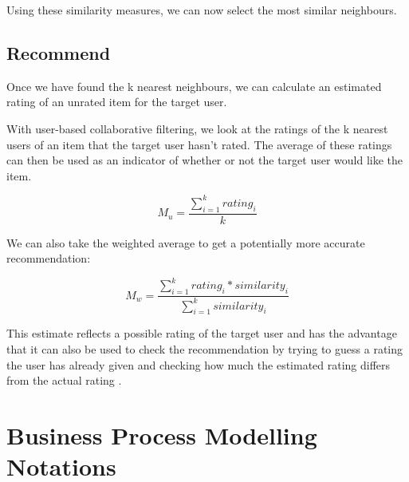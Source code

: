 Using these similarity measures, we can now select the most similar neighbours.

\subsection{Recommend}

Once we have found the k nearest neighbours, we can calculate an estimated rating of an unrated item for the target user. 

With user-based collaborative filtering, we look at the ratings of the k nearest users of an item that the target user hasn't rated. The average of these ratings can then be used as an indicator of whether or not the target user would like the item.

\begin{equation}
M_{u} = \frac{\sum_{i=1}^{k}{rating_i}}{k}
\label{mean}
\end{equation}

We can also take the weighted average to get a potentially more accurate recommendation:

\begin{equation}
M_{w} = \frac{\sum_{i=1}^{k}{rating_i * similarity_i}}{\sum_{i=1}^{k}{similarity_i}}
\label{weightedMean}
\end{equation}


This estimate reflects a possible rating of the target user and has the advantage that it can also be used to check the recommendation by trying to guess a rating the user has already given and checking how much the estimated rating differs from the actual rating \cite{miningOfMassiveDatasets}. 


\section{Business Process Modelling Notations}

